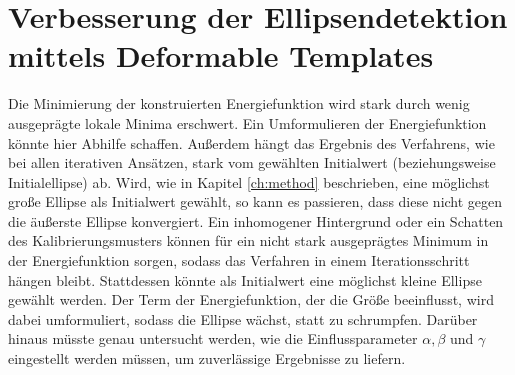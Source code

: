 \section{Verbesserung der Ellipsendetektion mittels Deformable Templates}
Die Minimierung der konstruierten Energiefunktion wird stark durch wenig ausgeprägte lokale Minima erschwert. Ein Umformulieren der Energiefunktion könnte hier Abhilfe schaffen. 
Außerdem hängt das Ergebnis des Verfahrens, wie bei allen iterativen Ansätzen, stark vom gewählten Initialwert (beziehungsweise Initialellipse) ab. 
Wird, wie in Kapitel \ref{ch:method} beschrieben, eine möglichst große Ellipse als Initialwert gewählt, so kann es passieren, dass diese nicht gegen die äußerste Ellipse konvergiert. 
Ein inhomogener Hintergrund oder ein Schatten des Kalibrierungsmusters können für ein nicht stark ausgeprägtes Minimum in der Energiefunktion sorgen, sodass das Verfahren in einem Iterationsschritt hängen bleibt. 
Stattdessen könnte als Initialwert eine möglichst kleine Ellipse gewählt werden. Der Term der Energiefunktion, der die Größe beeinflusst, wird dabei umformuliert, sodass die Ellipse wächst, statt zu schrumpfen. 
Darüber hinaus müsste genau untersucht werden, wie die Einflussparameter $\alpha,\beta$ und $\gamma$ eingestellt werden müssen, um zuverlässige Ergebnisse zu liefern.


